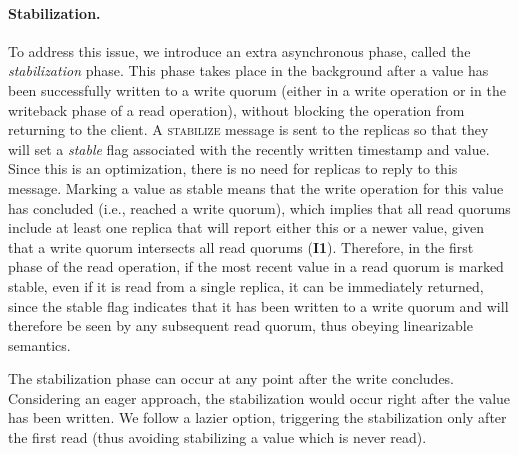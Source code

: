 


\paragraph{Stabilization.}
To address this issue, we introduce an extra asynchronous phase,
called the \emph{stabilization} phase. This phase takes
place in the background after a value has been successfully
written to a write quorum (either in a write operation or in the
writeback phase of a read operation), without
blocking the operation from returning to the client. A
\textsc{stabilize} message is sent to the replicas so that they
will set a \emph{stable} flag associated with the recently
written timestamp and value. Since this is an optimization, there
is no need for replicas to reply to this message.  Marking a
value as stable means that the write operation for this value has
concluded (i.e., reached a write quorum), which implies that all
read quorums include at least one replica that will report either
this or a newer value, given that a write quorum intersects all
read quorums (\textbf{I1}). Therefore, in the first phase of the
read operation, if the most recent value in a read quorum is
marked stable, even if it is read from a single replica, it can
be immediately returned, since the stable flag indicates that it
has been written to a write quorum and will therefore be seen by
any subsequent read quorum, thus obeying linearizable semantics.

The stabilization phase can
occur at any point after the write concludes. Considering an eager
approach, the stabilization would occur right after the value has been
written. We follow a lazier option, triggering the stabilization only
after the first read (thus avoiding stabilizing a value which is never
read).

